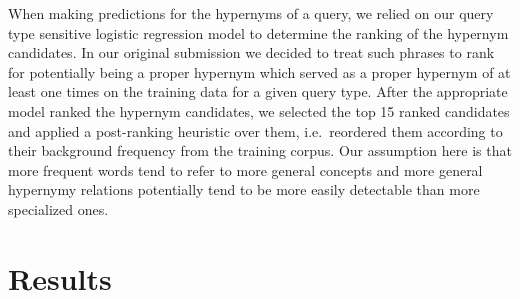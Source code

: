 \documentclass[11pt,a4paper]{article}
\begin{document}
When making predictions for the hypernyms of a query, we relied on our query
type sensitive logistic regression model to determine the ranking of the
hypernym candidates. In our original submission we decided to treat such
phrases to rank for potentially being a proper hypernym which served as a
proper hypernym of at least one times on the training data for a given query
type. After the appropriate model ranked the hypernym candidates, we selected
the top 15 ranked candidates and applied a post-ranking heuristic over them,
i.e.~reordered them according to their background frequency from the training
corpus. Our assumption here is that more frequent words tend to refer to more
general concepts and more general hypernymy relations potentially tend to be
more easily detectable than more specialized ones.

\section{Results} \label{sec:results}

\begin{table*}
  \caption{Our submissions results.}
  \label{table:submissions}
\end{table*}
\end{document}
